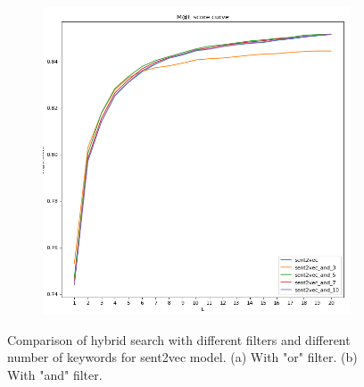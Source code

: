 \documentclass[10pt,a4paper,fleqn]{report}
\begin{document}
\begin{figure}[htbp]
\begin{subfigure}[b]{0.48\textwidth}
						\includegraphics[width=\textwidth]{figure/sent2vec_and.png}
						\caption{}
						\label{fig: hybrid_sent2vec_and}
					\end{subfigure}
					\hfill
					\caption[]{Comparison of hybrid search with different filters and different number of keywords for sent2vec model. (a) With "or" filter. (b) With "and" filter.}
					\label{fig: hybrid_sent2vec_and_or}
				\end{figure}
				
\end{document}
